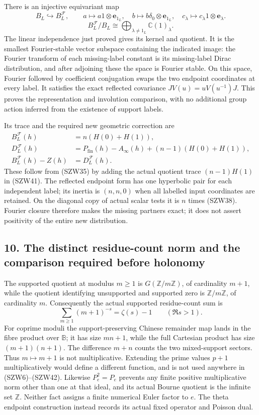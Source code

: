 \documentclass[
  10pt,
  a4paper,
]{article}
\begin{document}
There is an injective equivariant map \[
B_L\hookrightarrow B_L^{\mathcal F},\qquad
a\mapsto a1\otimes\mathbf e_{1_L},\quad
b\mapsto b\delta_0\otimes\mathbf e_{1_L},\quad
c_\lambda\mapsto c_\lambda1\otimes\mathbf e_\lambda.
\] \[
B_L^{\mathcal F}/B_L
\cong\bigoplus_{\lambda\ne1_L}\mathbb C(1)_\lambda.
\tag{SZW41}
\] The linear independence just proved gives its kernel and quotient. It
is the smallest Fourier-stable vector subspace containing the indicated
image: the Fourier transform of each missing-label constant is its
missing-label Dirac distribution, and after adjoining these the space is
Fourier stable. On this space, Fourier followed by coefficient
conjugation swaps the two endpoint coordinates at every label. It
satisfies the exact reflected covariance \(J V(u)=u V(u^{-1})J\). This
proves the representation and involution comparison, with no additional
group action inferred from the existence of support labels.

Its trace and the required new geometric correction are \[
\begin{aligned}
B_L^{\mathcal F}(h)&=n(H(0)+H(1)),\\
D_L^{\mathcal F}(h)&=P_{\mathrm{fin}}(h)-A_\infty(h)
+(n-1)(H(0)+H(1)),\\
B_L^{\mathcal F}(h)-Z(h)&=D_L^{\mathcal F}(h).
\end{aligned}
\tag{SZW42}
\] These follow from (SZW35) by adding the actual quotient trace
\((n-1)H(1)\) in (SZW41). The reflected endpoint form has one hyperbolic
pair for each independent label; its inertia is \((n,n,0)\) when all
labelled input coordinates are retained. On the diagonal copy of actual
scalar tests it is \(n\) times (SZW38). Fourier closure therefore makes
the missing partners exact; it does not assert positivity of the entire
new distribution.

\subsection{10. The distinct residue-count norm and the comparison
required before
holonomy}\label{the-distinct-residue-count-norm-and-the-comparison-required-before-holonomy}

The supported quotient at modulus \(m\ge1\) is
\(G(\mathbb Z/m\mathbb Z)\), of cardinality \(m+1\), while the quotient
identifying unsupported and supported zero is \(\mathbb Z/m\mathbb Z\),
of cardinality \(m\). Consequently the actual supported residue-count
sum is \[
\sum_{m\ge1}(m+1)^{-s}=\zeta(s)-1\qquad(\Re s>1).
\tag{SZW43}
\] For coprime moduli the support-preserving Chinese remainder map lands
in the fibre product over \(\mathbb B\); it has size \(mn+1\), while the
full Cartesian product has size \((m+1)(n+1)\). The difference \(m+n\)
counts the two mixed-support sectors. Thus \(m\mapsto m+1\) is not
multiplicative. Extending the prime values \(p+1\) multiplicatively
would define a different function, and is not used anywhere in
(SZW6)--(SZW42). Likewise \(P_e^2=P_e\) prevents any finite positive
multiplicative norm other than one at that ideal, and its actual Bourne
quotient is the infinite set \(\mathbb Z\). Neither fact assigns a
finite numerical Euler factor to \(e\). The theta endpoint construction
instead records its actual fixed operator and Poisson dual.
\end{document}
